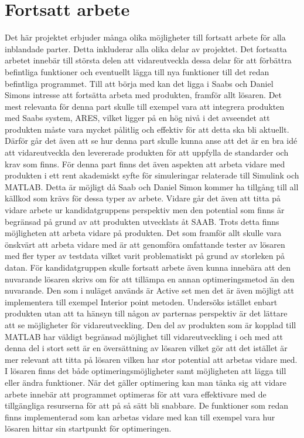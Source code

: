 \section{Fortsatt arbete}
Det här projektet erbjuder många olika möjligheter till fortsatt arbete för alla inblandade parter. Detta inkluderar alla olika delar av projektet. Det fortsatta arbetet innebär till största delen att vidareutveckla dessa delar för att förbättra befintliga funktioner och eventuellt lägga till nya funktioner till det redan befintliga programmet. 
\newline \newline
Till att börja med kan det ligga i Saabs och Daniel Simons intresse att fortsätta arbeta med produkten, framför allt lösaren. Det mest relevanta för denna part skulle till exempel vara att integrera produkten med Saabs system, ARES, vilket ligger på en hög nivå i det avseendet att produkten måste vara mycket pålitlig och effektiv för att detta ska bli aktuellt. Därför går det även att se hur denna part skulle kunna anse att det är en bra idé att vidareutveckla den levererade produkten för att uppfylla de standarder och krav som finns. För denna part finns det även aspekten att arbeta vidare med produkten i ett rent akademiskt syfte för simuleringar relaterade till Simulink och MATLAB. Detta är möjligt då Saab och Daniel Simon kommer ha tillgång till all källkod som krävs för dessa typer av arbete.
\newline \newline
Vidare går det även att titta på vidare arbete ur kandidatgruppens perspektiv men den potential som finns är begränsad på grund av att produkten utvecklats åt SAAB. Trots detta finns möjligheten att arbeta vidare på produkten. Det som framför allt skulle vara önskvärt att arbeta vidare med är att genomföra omfattande tester av lösaren med fler typer av testdata vilket varit problematiskt på grund av storleken på datan. För kandidatgruppen skulle fortsatt arbete även kunna innebära att den nuvarande lösaren skrivs om för att tillämpa en annan optimeringsmetod än den nuvarande. Den som i nuläget används är Active set men det är även möjligt att implementera till exempel Interior point metoden.
\newline \newline
Undersöks istället enbart produkten utan att ta hänsyn till någon av parternas perspektiv är det lättare att se möjligheter för vidareutveckling. Den del av produkten som är kopplad till MATLAB har väldigt begränsad möjlighet till vidareutveckling i och med att denna del i stort sett är en översättning av lösaren vilket gör att det istället är mer relevant att titta på lösaren vilken har stor potential att arbetas vidare med. I lösaren finns det både optimeringsmöjligheter samt möjligheten att lägga till eller ändra funktioner. När det gäller optimering kan man tänka sig att vidare arbete innebär att programmet optimeras för att vara effektivare med de tillgängliga resurserna för att på så sätt bli snabbare. De funktioner som redan finns implementerad som kan arbetas vidare med kan till exempel vara hur lösaren hittar sin startpunkt för optimeringen.
